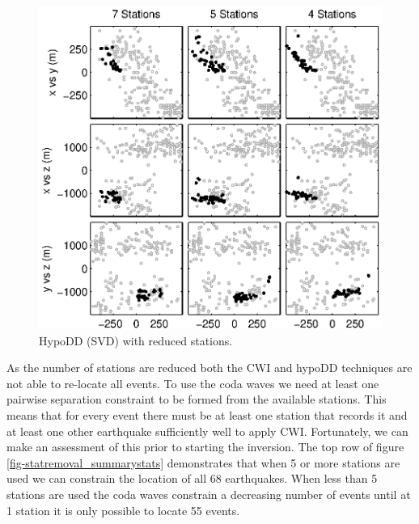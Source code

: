 \documentclass[extra]{gji}
\begin{document}
\begin{figure}
\includegraphics[height = 25pc]{diags/CalaverasLoc3_hypoDD_SVD.eps}
\caption{HypoDD (SVD) with reduced stations.}
\label{fig-HYPODDreducesstats}
\end{figure}


As the number of stations are reduced both the CWI and hypoDD
techniques are not able to re-locate all events. To use the coda
waves we need at least one pairwise separation constraint to be
formed from the available stations. This means that for every event
there must be at least one station that records it and at least one
other earthquake sufficiently well to apply CWI. Fortunately, we can
make an assessment of this prior to starting the inversion. The top
row of figure \ref{fig-statremoval_summarystats} demonstrates that
when 5 or more stations are used we can constrain the location of
all 68 earthquakes. When less than 5 stations are used the coda
waves constrain a decreasing number of events until at 1 station it
is only possible to locate 55 events.

\end{document}
